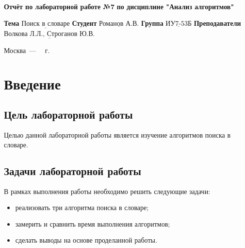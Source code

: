 \documentclass[12pt]{report}
\begin{document}
\begin{titlepage}
		
		\begin{center}
			\noindent\begin{minipage}{1.3\textwidth}\centering
				\Large\textbf{  Отчёт по лабораторной работе №7}\newline
				\textbf{по дисциплине "Анализ алгоритмов"}\newline\newline
			\end{minipage}
		\end{center}
		
		\noindent\textbf{Тема} $\underline{\text{Поиск в словаре}}$\newline\newline
		\noindent\textbf{Студент} $\underline{\text{Романов А.В.}}$\newline\newline
		\noindent\textbf{Группа} $\underline{\text{ИУ7-53Б}}$\newline\newline
		\noindent\textbf{Преподаватели} $\underline{\text{Волкова Л.Л., Строганов Ю.В.}}$\newline\newline\newline
		
		\begin{center}
			\vfill
			Москва~---~\the\year
			~г.
		\end{center}
	\end{titlepage}
	
	
	\tableofcontents
	
	\newpage
	\chapter*{Введение}
	
	
	\section*{Цель лабораторной работы}
	
	Целью данной лабораторной работы является изучение алгоритмов поиска в словаре.
	
	\section*{Задачи лабораторной работы}
	
	В рамках выполнения работы необходимо решить следующие задачи:
	
	\begin{itemize}
		\item реализовать три алгоритма поиска в словаре;
		\item замерить и сравнить время выполнения алгоритмов;
		\item сделать выводы на основе проделанной работы.
	\end{itemize}
	
\end{document}
